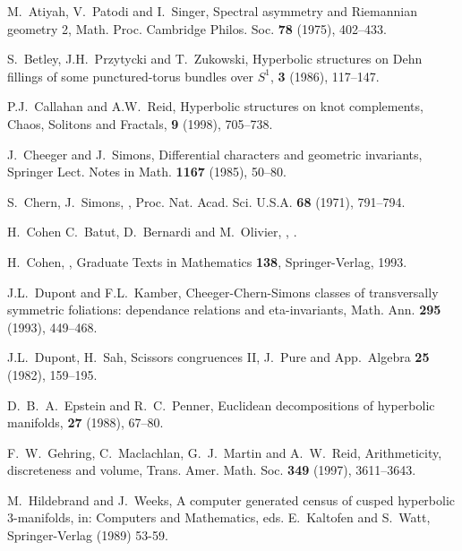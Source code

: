 \documentclass[a4paper]{amsart}
\theoremstyle{definition}
\begin{document}
\vfill
\eject

\begin{thebibliography}{99}

M.~Atiyah, V.~Patodi and I.~Singer,
\newblock  Spectral asymmetry and Riemannian geometry 2,
\newblock Math. Proc. Cambridge Philos. Soc. {\bf78} (1975), 402--433. 

S.~Betley, J.H.~Przytycki and T.~Zukowski,
\newblock Hyperbolic structures on Dehn fillings of some 
punctured-torus bundles over $S^1$,
 {\bf 3} (1986), 117--147.

P.J.~Callahan and A.W.~Reid, 
\newblock Hyperbolic structures on knot complements,
\newblock Chaos, Solitons and Fractals, {\bf9} (1998), 705--738.

J.~Cheeger and J.~Simons, 
\newblock Differential characters and geometric invariants,
\newblock  Springer Lect. Notes in Math. {\bf1167} (1985), 50--80.

S.~Chern, J.~Simons, 
,
\newblock  Proc. Nat. Acad. Sci. U.S.A. {\bf68} (1971), 791--794.

H.~Cohen C.~Batut, D.~Bernardi and M.~Olivier,
,
.


H.~Cohen,
,
\newblock Graduate Texts in Mathematics {\bf 138}, Springer-Verlag, 1993.

J.L.~Dupont and F.L.~Kamber,
\newblock Cheeger-Chern-Simons classes of transversally symmetric foliations:
dependance relations and eta-invariants,
\newblock  Math. Ann. {\bf295} (1993), 449--468.

J.L.~Dupont, H.~Sah,  Scissors congruences II, J.\ Pure and App.\
Algebra {\bf25} (1982), 159--195.

D.~B.~A.~Epstein and R.~C.~Penner,
\newblock Euclidean decompositions of hyperbolic manifolds,
 {\bf27} (1988), 67--80.

 F.~W.~Gehring, C.~Maclachlan, G.~J.~Martin and A.~W.~Reid,
\newblock Arithmeticity, discreteness and volume,
\newblock Trans. Amer. Math. Soc. {\bf349} (1997), 3611--3643.

 M.~Hildebrand and J.~Weeks,  A computer generated census of
cusped hyperbolic 3-manifolds, in: Computers and Mathematics, eds.
E.~Kaltofen and S.~Watt, Springer-Verlag (1989) 53-59.


\end{thebibliography}
\end{document}
